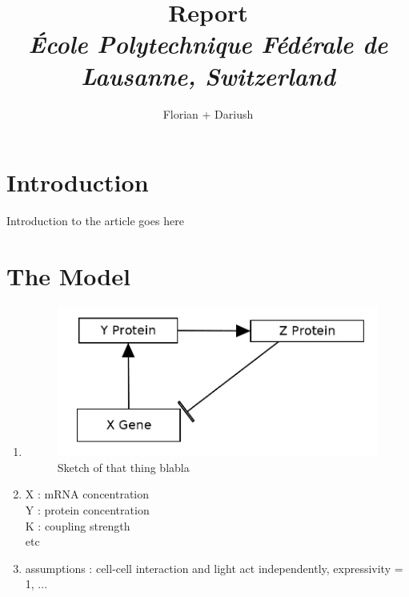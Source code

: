 \documentclass[10pt,a4paper,oneside,twocolumn]{article} %
\numberwithin{equation}{section} %
\begin{document}
\title{\huge{\textbf{Report}}\\
	\vspace{0.5cm}
	\Large{\textit{\'Ecole Polytechnique F\'ed\'erale de Lausanne, Switzerland}}}
\author{\large{Florian + Dariush}}

\begin{titlepage}
 \maketitle
\thispagestyle{empty}
\end{titlepage}

\section{Introduction}
    Introduction to the article goes here \\
\section{The Model}
    \begin{enumerate}
	\item
	    \begin{figure}[!h]
		    \includegraphics[scale=0.5]{sketch.png}
		    \caption{Sketch of that thing blabla}
	    \end{figure}
	\item X : mRNA concentration \\
	Y : protein concentration \\
	K : coupling strength\\
	etc\\

	\item assumptions : cell-cell interaction and light act independently, expressivity = 1, ...

    \end{enumerate}
\end{document}
